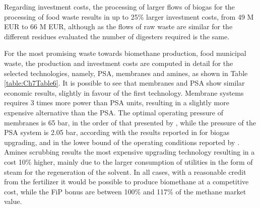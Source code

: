 \begin{refsection}[referencesCh7]
Regarding investment costs, the processing of larger flows of biogas for the processing of food waste results in up to 25\% larger investment costs, from 49 M EUR to 66 M EUR, although as the flows of raw
waste are similar for the different residues evaluated the number of digesters required is the same.

For the most promising waste towards biomethane production, food municipal waste, the production and investment costs are computed in detail for the selected technologies, namely, PSA, membranes and amines, as shown in Table \ref{table:Ch7Table6}. It is possible to see that membranes and PSA show similar economic results, slightly in favour of the first technology. Membrane systems requires 3 times more power than PSA units, resulting in a slightly more expensive alternative than the PSA. The optimal operating pressure of membranes is 65 bar, in the order of that presented by \citet{kim2017optimization}, while the pressure of the PSA system is 2.05 bar, according with the results reported in \citet{ferella2017separation} for biogas upgrading, and in the lower bound of the operating conditions reported by \citet{santos2011pressure}. Amines scrubbing results the most expensive upgrading technology resulting in a cost 10\% higher, mainly due to the larger consumption of utilities in the form of steam for the regeneration of the solvent. In all cases, with a reasonable credit from the fertilizer it would be possible to produce biomethane at a competitive cost, while the FiP bonus are between 100\% and 117\% of the methane market value.


\end{refsection}

